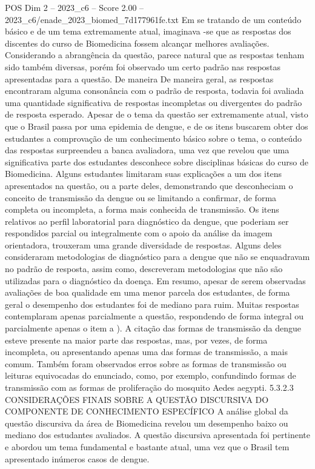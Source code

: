 \begin{textsample}{POS Dim 2 – 2023\_c6 – Score 2.00 – 2023\_c6/enade\_2023\_biomed\_7d177961fe.txt}
Em se tratando de um conteúdo básico e de um tema extremamente atual, imaginava -se que as respostas dos discentes do curso de Biomedicina fossem alcançar melhores avaliações.
Considerando a abrangência da questão, parece natural que as respostas tenham sido também diversas, porém foi observado um certo padrão nas respostas apresentadas para a questão.
De maneira De maneira geral, as respostas encontraram alguma consonância com o padrão de resposta, todavia foi avaliada uma quantidade significativa de respostas incompletas ou divergentes do padrão de resposta esperado.
Apesar de o tema da questão ser extremamente atual, visto que o Brasil passa por uma epidemia de dengue, e de os itens buscarem obter dos estudantes a comprovação de um conhecimento básico sobre o tema, o conteúdo das respostas surpreendeu a banca avaliadora, uma vez que revelou que uma significativa parte dos estudantes desconhece sobre disciplinas básicas do curso de Biomedicina.
Alguns estudantes limitaram suas explicações a um dos itens apresentados na questão, ou a parte deles, demonstrando que desconheciam o conceito de transmissão da dengue ou se limitando a confirmar, de forma completa ou incompleta, a forma mais conhecida de transmissão.
Os itens relativos ao perfil laboratorial para diagnóstico da dengue, que poderiam ser respondidos parcial ou integralmente com o apoio da análise da imagem orientadora, trouxeram uma grande diversidade de respostas.
Alguns deles consideraram metodologias de diagnóstico para a dengue que não se enquadravam no padrão de resposta, assim como, descreveram metodologias que não são utilizadas para o diagnóstico da doença.
Em resumo, apesar de serem observadas avaliações de boa qualidade em uma menor parcela dos estudantes, de forma geral o desempenho dos estudantes foi de mediano para ruim.
Muitas respostas contemplaram apenas parcialmente a questão, respondendo de forma integral ou parcialmente apenas o item a ).
A citação das formas de transmissão da dengue esteve presente na maior parte das respostas, mas, por vezes, de forma incompleta, ou apresentando apenas uma das formas de transmissão, a mais comum.
Também foram observados erros sobre as formas de transmissão ou leituras equivocadas do enunciado, como, por exemplo, confundindo formas de transmissão com as formas de proliferação do mosquito Aedes aegypti. 5.3.2.3 CONSIDERAÇÕES FINAIS SOBRE A QUESTÃO DISCURSIVA DO COMPONENTE DE CONHECIMENTO ESPECÍFICO A análise global da questão discursiva da área de Biomedicina revelou um desempenho baixo ou mediano dos estudantes avaliados.
A questão discursiva apresentada foi pertinente e abordou um tema fundamental e bastante atual, uma vez que o Brasil tem apresentado inúmeros casos de dengue.

\end{textsample}
